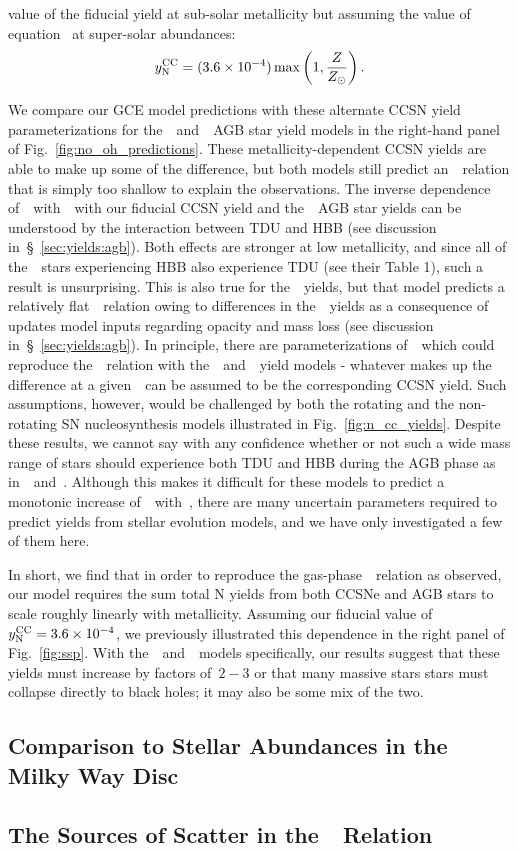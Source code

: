 \documentclass[ms.tex]{subfiles}
\begin{document}
value of the fiducial yield at sub-solar metallicity but assuming the value of
equation~ at super-solar abundances:
\begin{equation}
y_\text{N}^\text{CC} = (3.6\times10^{-4})\max\left(1, \frac{Z}{Z_\odot}\right).
\label{eq:broken_yncc}
\end{equation}
\par
We compare our GCE model predictions with these alternate CCSN yield
parameterizations for the~\karakasten~and~\karakas~AGB star yield models in
the right-hand panel of Fig.~\ref{fig:no_oh_predictions}.
These metallicity-dependent CCSN yields are able to make up some of the
difference, but both models still predict an~\ohno~relation that is simply
too shallow to explain the observations.
The inverse dependence of~\no~with~\oh~with our fiducial CCSN yield and
the~\karakasten~AGB star yields can be understood by the interaction between
TDU and HBB (see discussion in~\S~\ref{sec:yields:agb}).
Both effects are stronger at low metallicity, and since all of
the~\karakasten~stars experiencing HBB also experience TDU (see their Table 1),
such a result is unsurprising.
This is also true for the~\karakas~yields, but that model predicts a relatively
flat~\ohno~relation owing to differences in the~\Nfourteen~yields as a
consequence of updates model inputs regarding opacity and mass loss (see
discussion in~\S~\ref{sec:yields:agb}).
In principle, there are parameterizations of~~which could reproduce
the~\ohno~relation with the~\karakasten~and~\karakas~yield models - whatever
makes up the difference at a given~\oh~can be assumed to be the corresponding
CCSN yield.
Such assumptions, however, would be challenged by both the rotating and the
non-rotating SN nucleosynthesis models illustrated in
Fig.~\ref{fig:n_cc_yields}.
Despite these results, we cannot say with any confidence whether or not such
a wide mass range of stars should experience both TDU and HBB during the AGB
phase as in~\karakasten~and~\karakas.
Although this makes it difficult for these models to predict a monotonic
increase of~\no~with~\oh, there are many uncertain parameters required to
predict yields from stellar evolution models, and we have only investigated a
few of them here.
\par
In short, we find that in order to reproduce the gas-phase~\ohno~relation as
observed, our model requires the sum total N yields from both CCSNe and AGB
stars to scale roughly linearly with metallicity.
Assuming our fiducial value of~$y_\text{N}^\text{CC} = 3.6\times10^{-4}$, we previously
illustrated this dependence in the right panel of Fig.~\ref{fig:ssp}.
With the~\cristallo~and~\ventura~models specifically, our results suggest that
these yields must increase by factors of~$2 - 3$ or that many massive stars
stars must collapse directly to black holes; it may also be some mix of the
two.


\subsection{Comparison to Stellar Abundances in the Milky Way Disc}
\label{sec:results:vincenzo_comp}

\subsection{The Sources of Scatter in the~\ohno~Relation}
\label{sec:results:schaefer_comp}
\end{document}
